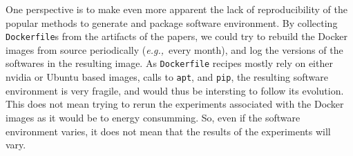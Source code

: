 \documentclass[sigconf,natbib=false]{acmart}
\newcommand{\eg}{\emph{e.g.,}}
\begin{document}
One perspective is to make even more apparent the lack of reproducibility of the popular methods to generate and package software environment.
By collecting \texttt{Dockerfile}s from the artifacts of the papers, we could try to rebuild the Docker images from source periodically (\eg\ every month), and log the versions of the softwares in the resulting image.
As \texttt{Dockerfile} recipes mostly rely on either nvidia or Ubuntu based images, calls to \texttt{apt}, and \texttt{pip}, the resulting software environment is very fragile, and would thus be intersting to follow its evolution. 
This does not mean trying to rerun the experiments associated with the Docker images as it would be to energy consumming.
So, even if the software environment varies, it does not mean that the results of the experiments will vary.




%
%
\printbibliography
\end{document}
